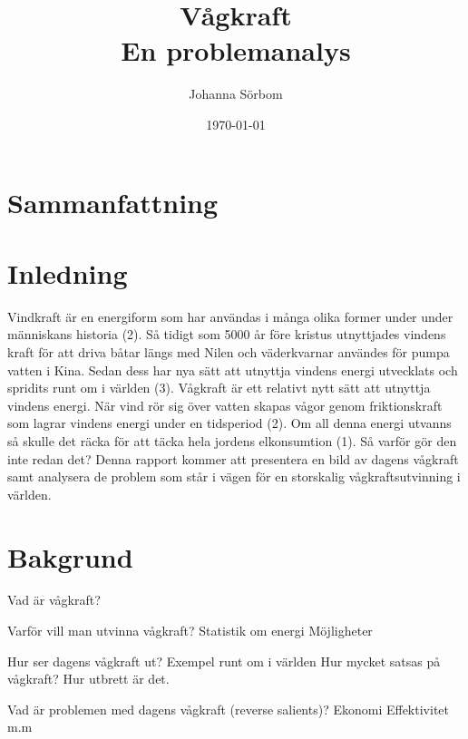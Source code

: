 \documentclass[10pt,a4paper,oneside]{article}
\title{Vågkraft \\ 
\large En problemanalys}
\author{\small Johanna Sörbom}
\date{\small \today}
\begin{document}
\maketitle
\newpage

\section{Sammanfattning}
\newpage

\tableofcontents
\newpage

\section{Inledning}
Vindkraft är en energiform som har användas i många olika former under under människans historia (2). Så tidigt som 5000 år före kristus utnyttjades vindens kraft för att driva båtar längs med Nilen och väderkvarnar användes för pumpa vatten i Kina. Sedan dess har nya sätt att utnyttja vindens energi utvecklats och spridits runt om i världen (3). Vågkraft är ett relativt nytt sätt att utnyttja vindens energi. När vind rör sig över vatten skapas vågor genom friktionskraft som lagrar vindens energi under en tidsperiod (2). Om all denna energi utvanns så skulle det räcka för att täcka hela jordens elkonsumtion (1). Så varför gör den inte redan det? Denna rapport kommer att presentera en bild av dagens vågkraft samt analysera de problem som står i vägen för en storskalig vågkraftsutvinning i världen. 
\newpage

\section{Bakgrund}
Vad är vågkraft? 

Varför vill man utvinna vågkraft?
Statistik om energi 
Möjligheter 

Hur ser dagens vågkraft ut?
Exempel runt om i världen
Hur mycket satsas på vågkraft?
Hur utbrett är det.

Vad är problemen med dagens vågkraft (reverse salients)?
Ekonomi
Effektivitet 
m.m 
\end{document}
